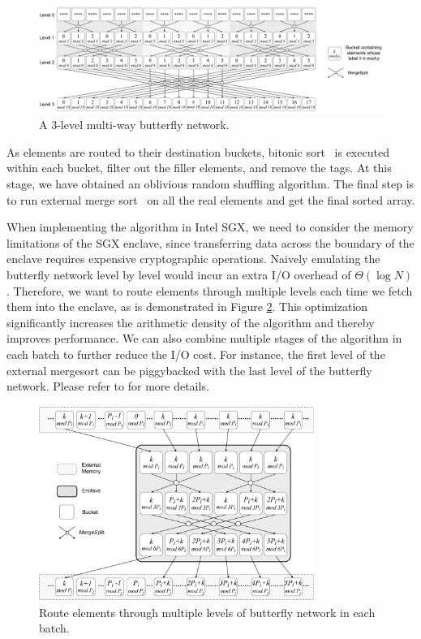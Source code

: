 \documentclass{article}
\begin{document}
\begin{figure}[thbp]
    \centering
    \includegraphics[width=\textwidth]{assets/multi-way-butterfly.png}
    \caption{A 3-level multi-way butterfly network.}
    \label{fig:butterfly}
\end{figure}

As elements are routed to their destination buckets, bitonic sort~\cite{bitonicsort} is executed within each bucket, filter out the filler elements, and remove the tags. At this stage, we have obtained an oblivious random shuffling algorithm. The final step is to run external merge sort~\cite{knuthbook} on all the real elements and get the final sorted array.

When implementing the algorithm in Intel SGX, we need to consider the memory limitations of the SGX enclave, since transferring data across the boundary of the enclave requires expensive cryptographic operations. Naively emulating the butterfly network level by level would incur an extra I/O overhead of $\Theta(\log N)$. Therefore, we want to route elements through multiple levels each time we fetch them into the enclave, as is demonstrated in Figure \ref{fig:batch}. This optimization significantly increases the arithmetic density of the algorithm and thereby improves performance. We can also combine multiple stages of the algorithm in each batch to further reduce the I/O cost. For instance, the first level of the external mergesort can be piggybacked with the last level of the butterfly network. Please refer to \cite{osort} for more details.

\begin{figure}[thbp]
    \centering
    \includegraphics[width=0.8\textwidth]{assets/batch.png}
    \caption{Route elements through multiple levels of butterfly network in each batch.}
    \label{fig:batch}
\end{figure}
\end{document}
